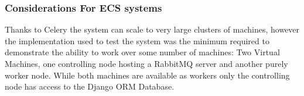 \subsubsection{Considerations For ECS systems}
Thanks to Celery the system can scale to very large clusters of machines, however the implementation used to test the system was the minimum required to demonstrate the ability to work over some number of machines: Two Virtual Machines, one controlling node hosting a RabbitMQ server and another purely worker node. While both machines are available as workers only the controlling node has access to the Django ORM Database.